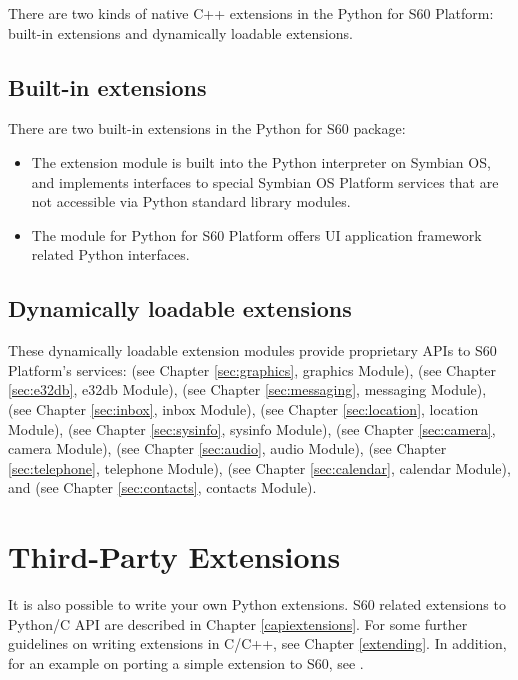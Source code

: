 There are two kinds of native C++ extensions in the Python for S60 
Platform: built-in extensions and dynamically loadable extensions.

\subsection{Built-in extensions}
\label{sec:built}

There are two built-in extensions in the Python for S60 package:

\begin{itemize}
\item The  extension module is built into the Python interpreter on Symbian OS, and implements interfaces to special Symbian OS Platform services that are not accessible via Python standard library modules.
\item The  module for Python for S60 Platform offers UI application framework related Python interfaces.
\end{itemize}

\subsection{Dynamically loadable extensions}
\label{sec:dynamically}

These dynamically loadable extension modules provide proprietary APIs
to S60 Platform's services:  (see Chapter
\ref{sec:graphics}, graphics Module),  (see Chapter
\ref{sec:e32db}, e32db Module),
 (see Chapter \ref{sec:messaging}, messaging Module), 
 (see Chapter \ref{sec:inbox}, inbox Module),  
(see Chapter \ref{sec:location}, location Module),  (see Chapter 
\ref{sec:sysinfo}, sysinfo Module),  (see Chapter 
\ref{sec:camera}, camera Module),  (see Chapter \ref{sec:audio}, 
audio Module),  (see Chapter \ref{sec:telephone}, telephone 
Module),  (see Chapter \ref{sec:calendar}, calendar Module), 
and (see Chapter \ref{sec:contacts}, contacts Module).

\section{Third-Party Extensions}
\label{subsec:third}

It is also possible to write your own Python extensions. S60 related
extensions to Python/C API are described in Chapter
\ref{capiextensions}. For some further guidelines on writing
extensions in C/C++, see Chapter \ref{extending}. In
addition, for an example on porting a simple extension to S60, see
\cite{PyS60Prog}.
